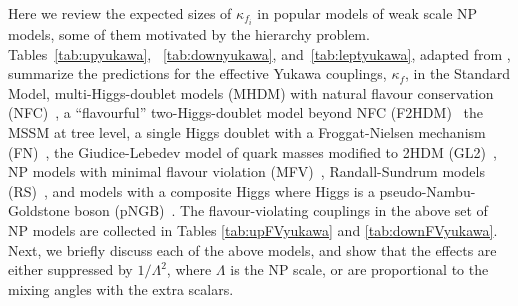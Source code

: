 \documentclass[../report.tex]{subfiles}
\begin{document}
Here we review the expected sizes of $\kappa_{f_i}$ in popular models of weak scale NP models, some of them motivated by the hierarchy problem. 
Tables~\ref{tab:upyukawa}, ~\ref{tab:downyukawa},
and~\ref{tab:leptyukawa}, adapted from
\cite{Bishara:2015cha,Dery:2014kxa,Dery:2013aba,Dery:2013rta,Bauer:2015kzy},
summarize the predictions for the effective Yukawa couplings,
$\kappa_f$, in the Standard Model, multi-Higgs-doublet models
(MHDM) with natural flavour conservation (NFC)~\cite{Glashow:1976nt,
  Paschos:1976ay}, a ``flavourful'' two-Higgs-doublet model beyond NFC
(F2HDM)~\cite{Altmannshofer:2015esa, Altmannshofer:2016zrn, 
Altmannshofer:2017uvs, Altmannshofer:2018bch} the MSSM at tree level, 
a single Higgs doublet with
a Froggat-Nielsen mechanism (FN)~\cite{Froggatt:1978nt}, the
Giudice-Lebedev model of quark masses modified to 2HDM
(GL2)~\cite{Giudice:2008uua}, NP models with minimal flavour violation
(MFV)~\cite{D'Ambrosio:2002ex}, Randall-Sundrum models
(RS)~\cite{Randall:1999ee}, and models with a composite Higgs where
Higgs is a pseudo-Nambu-Goldstone boson (pNGB)~\cite{Dugan:1984hq,
  Georgi:1984ef, Kaplan:1983sm, Kaplan:1983fs}. The flavour-violating
couplings in the above set of NP models are collected in Tables
\ref{tab:upFVyukawa} and \ref{tab:downFVyukawa}. Next, we briefly
discuss each of the above models, and show that the effects are either
suppressed by $1/\Lambda^2$, where $\Lambda$ is the NP scale, or are
proportional to the mixing angles with the extra scalars.
\end{document}
